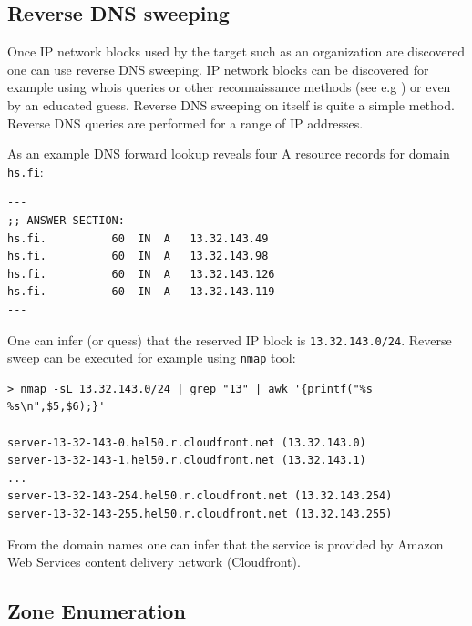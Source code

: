 



\subsection{Reverse DNS sweeping}

Once IP network blocks used by the target such as an organization are discovered one can use reverse DNS sweeping. IP network blocks can be discovered for example using whois queries or other reconnaissance methods (see e.g \cite{network_sec_assessment}) or even by an educated guess. Reverse DNS sweeping on itself is quite a simple method. Reverse DNS queries are performed for a range of IP addresses. 

As an example DNS forward lookup reveals four A resource records for domain \texttt{hs.fi}:
\begin{verbatim}
---
;; ANSWER SECTION:
hs.fi.			60	IN	A	13.32.143.49
hs.fi.			60	IN	A	13.32.143.98
hs.fi.			60	IN	A	13.32.143.126
hs.fi.			60	IN	A	13.32.143.119
---
\end{verbatim}
One can infer (or quess) that the reserved IP block is \texttt{13.32.143.0/24}. Reverse sweep can be executed for example using \texttt{nmap} tool:
\begin{verbatim}
> nmap -sL 13.32.143.0/24 | grep "13" | awk '{printf("%s %s\n",$5,$6);}'

server-13-32-143-0.hel50.r.cloudfront.net (13.32.143.0)
server-13-32-143-1.hel50.r.cloudfront.net (13.32.143.1)
...
server-13-32-143-254.hel50.r.cloudfront.net (13.32.143.254)
server-13-32-143-255.hel50.r.cloudfront.net (13.32.143.255)
\end{verbatim}

From the domain names one can infer that the service is provided by Amazon Web Services content delivery network (Cloudfront).

\subsection{Zone Enumeration}


